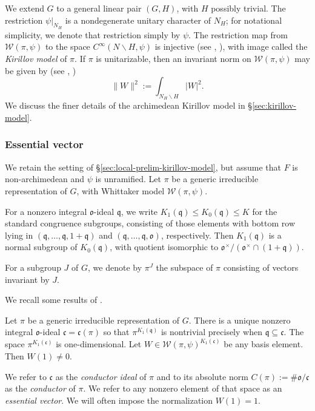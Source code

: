 We extend $G$ to a general linear pair $(G,H)$, with $H$ possibly trivial.  The restriction $\psi|_{N_H}$ is a nondegenerate unitary character of $N_H$; for notational simplicity, we denote that restriction simply by $\psi$.  The restriction map from $\mathcal{W}(\pi,\psi)$ to the space $C^\infty(N \backslash H, \psi)$ is injective (see \cite[\S6.5]{MR748505}, \cite[\S10.2]{MR1999922}), with image called the \emph{Kirillov model} of $\pi$.  If $\pi$ is unitarizable, then an invariant norm on $\mathcal{W}(\pi,\psi)$ may be given by (see \cite[\S6.4]{MR748505}, \cite[\S10.2]{MR1999922})
\begin{equation*}
  \|W\|^2 := \int_{N_H \backslash H} |W|^2.
\end{equation*}
We discuss the finer details of the archimedean Kirillov model in \S\ref{sec:kirillov-model}.

\subsubsection{Essential vector}\label{sec:essential-vector}
We retain the setting of \S\ref{sec:local-prelim-kirillov-model}, but assume that $F$ is non-archimedean and $\psi$ is unramified.  Let $\pi$ be a generic irreducible representation of $G$, with Whittaker model $\mathcal{W}(\pi,\psi)$.

For a nonzero integral $\mathfrak{o}$-ideal $\mathfrak{q}$, we write $K_1(\mathfrak{q}) \leq K_0(\mathfrak{q}) \leq K$ for the standard congruence subgroups, consisting of those elements with bottom row lying in $(\mathfrak{q},\dotsc,\mathfrak{q},1 + \mathfrak{q})$ and $(\mathfrak{q},\dotsc,\mathfrak{q},\mathfrak{o})$, respectively.  Then $K_1(\mathfrak{q})$ is a normal subgroup of $K_0(\mathfrak{q})$, with quotient isomorphic to $\mathfrak{o}^\times / (\mathfrak{o}^\times \cap (1 + \mathfrak{q}))$.

For a subgroup $J$ of $G$, we denote by $\pi^J$ the subspace of $\pi$ consisting of vectors invariant by $J$.

We recall some results of \cite{MR620708, MR3138844, MR3001803}.
\begin{theorem}
  Let $\pi$ be a generic irreducible representation of $G$.  There is a unique nonzero integral $\mathfrak{o}$-ideal $\mathfrak{c} = \mathfrak{c}(\pi)$ so that $\pi^{K_1(\mathfrak{q})}$ is nontrivial precisely when $\mathfrak{q} \subseteq \mathfrak{c}$.  The space $\pi^{K_1(\mathfrak{c})}$ is one-dimensional.  Let $W \in \mathcal{W}(\pi,\psi)^{K_1(\mathfrak{c})}$ be any basis element.  Then $W(1) \neq 0$.
\end{theorem}
We refer to $\mathfrak{c}$ as the \emph{conductor ideal} of $\pi$ and to its absolute norm $C(\pi) := \# \mathfrak{o} / \mathfrak{c}$ as the \emph{conductor} of $\pi$.  We refer to any nonzero element of that space as an \emph{essential vector}.  We will often impose the normalization $W(1) = 1$.

